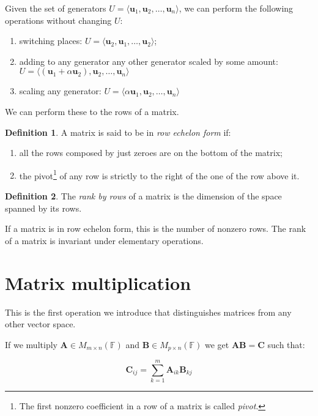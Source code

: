 \documentclass[12pt,a4paper]{report}
\numberwithin{equation}{section}
\theoremstyle{definition}
\newtheorem{definition}{Definition}[section]
\theoremstyle{remark}
\begin{document}
Given the set of generators $U = \langle \mathbf{u}_1, \mathbf{u}_2, \dots, \mathbf{u}_n\rangle$, we can perform the following operations without changing $U$:

\begin{enumerate}
\item switching places: $U = \langle \mathbf{u}_2, \mathbf{u}_1, \dots, \mathbf{u}_2 \rangle$;
\item adding to any generator any other generator scaled by some amount: $U = \langle (\mathbf{u}_1 + \alpha \mathbf{u}_2), \mathbf{u}_2, \dots, \mathbf{u}_n \rangle$
\item scaling any generator: $U = \langle \alpha \mathbf{u}_1, \mathbf{u}_2, \dots, \mathbf{u}_n\rangle$
\end{enumerate}

We can perform these to the rows of a matrix.

\begin{definition}
A matrix is said to be in \emph{row echelon form} if:
\begin{enumerate}
\item all the rows composed by just zeroes are on the bottom of the matrix;
\item the pivot\footnote{The first nonzero coefficient in a row of a matrix is called \emph{pivot}.} of any row is strictly to the right of the one of the row above it.
\end{enumerate}
\end{definition}

\begin{definition}
The \emph{rank by rows} of a matrix is the dimension of the space spanned by its rows. 
\end{definition}

If a matrix is in row echelon form, this is the number of nonzero rows. The rank of a matrix is invariant under elementary operations.

\section{Matrix multiplication}

This is the first operation we introduce that distinguishes matrices from any other vector space. 

If we multiply $\mathbf{A} \in M_{m\times n} (\mathbb{F})$ and $\mathbf{B} \in M_{p\times n} (\mathbb{F})$ we get $\mathbf{AB} = \mathbf{C}$ such that:

\begin{equation}
\mathbf{C}_{ij} = \sum_{k=1}^m \mathbf{A}_{ik} \mathbf{B}_{kj}
\end{equation}
\end{document}
